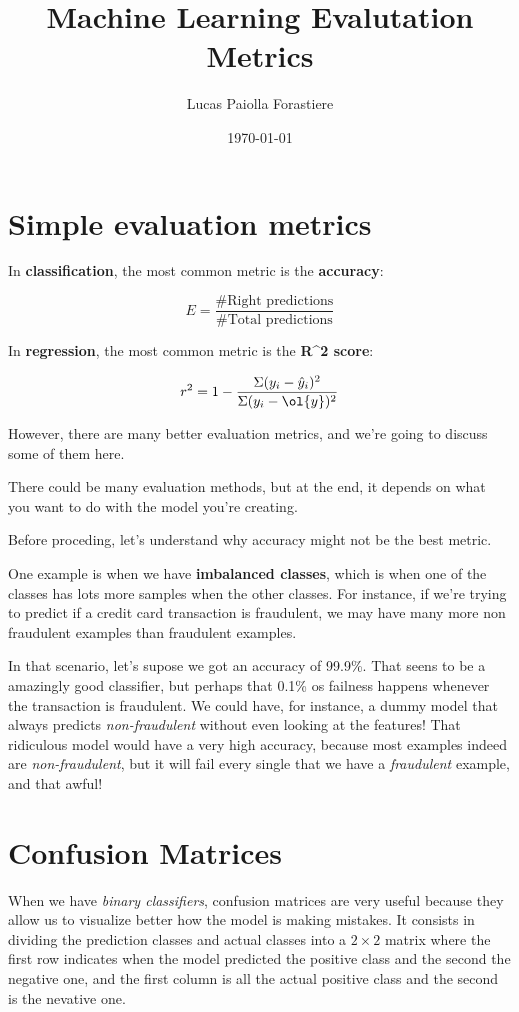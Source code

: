 \documentclass[12pt, a4paper, oneside]{article}
\title{Machine Learning Evalutation Metrics}
\date{\today}
\author{Lucas Paiolla Forastiere}
\begin{document}
\maketitle
\tableofcontents
\newpage

\section{Simple evaluation metrics}

In \textbf{classification}, the most common metric is the \textbf{accuracy}:

\[ E = \dfrac{\textrm{#Right predictions}}{\textrm{#Total predictions}}  \]

In \textbf{regression}, the most common metric is the \textbf{R^2 score}:

\[ r^2 = 1 - \dfrac{\Sigma(y_i-\hat{y}_i)^2}{\Sigma(y_i-\ol{y})^2} \]

However, there are many better evaluation metrics, and we're going to discuss
some of them here.

There could be many evaluation methods, but at the end, it depends on what you
want to do with the model you're creating.

Before proceding, let's understand why accuracy might not be the best metric.

One example is when we have \textbf{imbalanced classes}, which is when one of
the classes has lots more samples when the other classes. For instance, if we're
trying to predict if a credit card transaction is fraudulent, we may have many
more non fraudulent examples than fraudulent examples.

In that scenario, let's supose we got an accuracy of 99.9\%. That seens to be a
amazingly good classifier, but perhaps that 0.1\% os failness happens whenever
the transaction is fraudulent. We could have, for instance, a dummy model that
always predicts \textit{non-fraudulent} without even looking at the features!
That ridiculous model would have a very high accuracy, because most examples
indeed are \textit{non-fraudulent}, but it will fail every single that we have a
\textit{fraudulent} example, and that awful!

\section{Confusion Matrices}

When we have \textit{binary classifiers}, confusion matrices are very useful
because they allow us to visualize better how the model is making mistakes.
It consists in dividing the prediction classes and actual classes into a
$2\times 2$ matrix where the first row indicates when the model predicted the
positive class and the second the negative one, and the first column is all the
actual positive class and the second is the nevative one.
\end{document}
